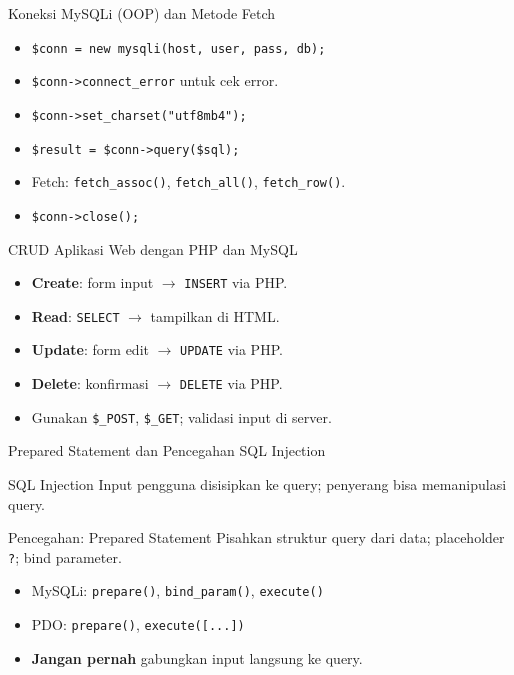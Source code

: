 \documentclass[handout]{beamer}
\begin{document}
\begin{frame}{Koneksi MySQLi (OOP) dan Metode Fetch}
	\begin{itemize}
		\item \texttt{\$conn = new mysqli(host, user, pass, db);}
		\item \texttt{\$conn->connect\_error} untuk cek error.
		\item \texttt{\$conn->set\_charset("utf8mb4");}
		\item \texttt{\$result = \$conn->query(\$sql);}
		\item Fetch: \texttt{fetch\_assoc()}, \texttt{fetch\_all()}, \texttt{fetch\_row()}.
		\item \texttt{\$conn->close();}
	\end{itemize}
\end{frame}

\begin{frame}{CRUD Aplikasi Web dengan PHP dan MySQL}
	\begin{itemize}
		\item \textbf{Create}: form input $\to$ \texttt{INSERT} via PHP.
		\item \textbf{Read}: \texttt{SELECT} $\to$ tampilkan di HTML.
		\item \textbf{Update}: form edit $\to$ \texttt{UPDATE} via PHP.
		\item \textbf{Delete}: konfirmasi $\to$ \texttt{DELETE} via PHP.
		\item Gunakan \texttt{\$\_POST}, \texttt{\$\_GET}; validasi input di server.
	\end{itemize}
\end{frame}

\begin{frame}{Prepared Statement dan Pencegahan SQL Injection}
	\begin{block}{SQL Injection}
		Input pengguna disisipkan ke query; penyerang bisa memanipulasi query.
	\end{block}
	\begin{block}{Pencegahan: Prepared Statement}
		Pisahkan struktur query dari data; placeholder \texttt{?}; bind parameter.
	\end{block}
	\begin{itemize}
		\item MySQLi: \texttt{prepare()}, \texttt{bind\_param()}, \texttt{execute()}
		\item PDO: \texttt{prepare()}, \texttt{execute([...])}
		\item \textbf{Jangan pernah} gabungkan input langsung ke query.
	\end{itemize}
\end{frame}
\end{document}
